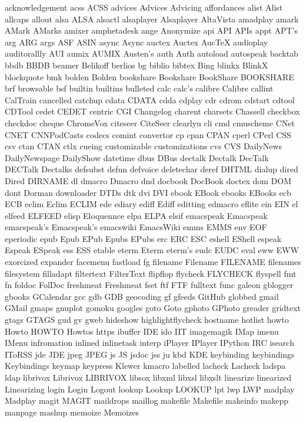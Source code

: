 acknowledgement
acss
ACSS
advices
Advices
Advicing
affordances
alist
Alist
allcaps
allout
alsa
ALSA
alsactl
alsaplayer
Alsaplayer
AltaVista
amadplay
amark
AMark
AMarks
amixer
amphetadesk
ange
Anonymize
api
API
APIs
appt
APT's
arg
ARG
args
ASF
ASIN
async
Async
auctex
Auctex
AucTeX
audioplay
auditorallly
AUI
aumix
AUMIX
Austen's
auth
Auth
autoload
autospeak
backtab
bbdb
BBDB
beamer
Belikoff
berlios
bg
biblio
bibtex
Bing
blinkx
BlinkX
blockquote
bmk
bolden
Bolden
bookshare
Bookshare
BookShare
BOOKSHARE
brf
browsable
bsf
builtin
builtins
bulleted
calc
calc's
calibre
Calibre
callint
CalTrain
cancelled
catchup
cdata
CDATA
cdda
cdplay
cdr
cdrom
cdstart
cdtool
CDTool
cedet
CEDET
centric
CGI
Changelog
charent
charsets
Chassell
checkbox
checkdoc
cheque
ChromeVox
citeseer
CiteSeer
clearlyu
cli
cmd
cmuscheme
CNet
CNET
CNNPodCasts
codecs
comint
convertor
cp
cpan
CPAN
cperl
CPerl
CSS
csv
ctan
CTAN
ctlx
cueing
customizable
customizations
cvs
CVS
DailyNews
DailyNewspage
DailyShow
datetime
dbus
DBus
dectalk
Dectalk
DecTalk
DECTalk
Dectalks
defsubst
defun
defvoice
deletechar
deref
DHTML
dialup
dired
Dired
DIRNAME
dl
dmacro
Dmacro
dnd
docbook
DocBook
doctex
dom
DOM
dont
Dorman
downloader
DTDs
dtk
dvi
DVI
ebook
EBook
ebooks
EBooks
ecb
ECB
eclim
Eclim
ECLIM
ede
ediary
ediff
Ediff
editting
edmacro
eflite
ein
EIN
el
elfeed
ELFEED
elisp
Eloquennce
elpa
ELPA
elsif
emacspeak
Emacspeak
emacspeak's
Emacspeak's
emacswiki
EmacsWiki
emms
EMMS
env
EOF
eperiodic
epub
Epub
EPub
Epubs
EPubs
erc
ERC
ESC
eshell
EShell
espeak
Espeak
ESpeak
ess
ESS
etable
eterm
Eterm
eterm's
eudc
EUDC
eval
eww
EWW
exorcized
expander
facemenu
fastload
fg
filename
Filename
FILENAME
filenames
filesystem
filladapt
filtertext
FilterText
flipflop
flycheck
FLYCHECK
flyspell
fmt
fn
foldoc
FolDoc
freshmeat
Freshmeat
fset
ftf
FTF
fulltext
func
galeon
gblogger
gbooks
GCalendar
gcc
gdb
GDB
geocoding
gf
gfeeds
GitHub
globbed
gmail
GMail
gmaps
gnuplot
gomoku
googles
goto
Goto
gphoto
GPhoto
greader
gridtext
gtags
GTAGS
gud
gv
gweb
hideshow
highlightflycheck
hostname
hotlist
howto
Howto
HOWTO
Howtos
https
ibuffer
IDE
ido
IIT
imagemagik
IMap
imenu
IMenu
infromation
inlined
inlinetask
interp
iPlayer
IPlayer
IPython
IRC
isearch
IToRSS
jde
JDE
jpeg
JPEG
js
JS
jsdoc
jss
ju
kbd
KDE
keybinding
keybindings
Keybindings
keymap
keypress
Klewer
kmacro
labelled
lacheck
Lacheck
ladspa
ldap
librivox
Librivox
LIBRIVOX
libsox
libxml
libxsl
libxslt
linearize
linearized
Linearizing
login
Login
Logout
lookup
Lookup
LOOKUP
lpt
lwp
LWP
madplay
Madplay
magit
MAGIT
maildrops
maillog
makefile
Makefile
makeinfo
makepp
manpage
mashup
memoize
Memoizes
